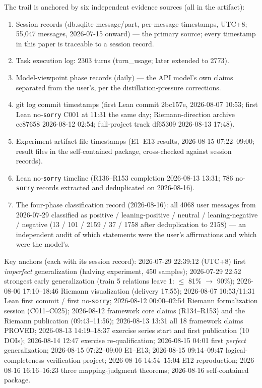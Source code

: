 \documentclass[sigplan,10pt,anonymous,review]{acmart}
\begin{document}
The trail is anchored by six independent evidence sources (all in the
artifact):

\begin{enumerate}
\item Session records (db.sqlite message/part, per-message timestamps,
UTC+8; 55{,}047 messages, 2026-07-15 onward) --- the primary source;
every timestamp in this paper is traceable to a session record.
\item Task execution log: 2303 turns (turn\_usage; later extended to
2773).
\item Model-viewpoint phase records (daily) --- the API model's own
claims separated from the user's, per the distillation-pressure
corrections.
\item git log commit timestamps (first Lean commit 2bc157e, 2026-08-07
10:53; first Lean no-\texttt{sorry} C001 at 11:31 the same day;
Riemann-direction archive ec87658 2026-08-12 02:54; full-project track
df65309 2026-08-13 17:48).
\item Experiment artifact file timestamps (E1--E13 results, 2026-08-15
07:22--09:00; result files in the self-contained package, cross-checked
against session records).
\item Lean no-\texttt{sorry} timeline (R136--R153 completion 2026-08-13
13:31; 786 no-\texttt{sorry} records extracted and deduplicated on
2026-08-16).
\item The four-phase classification record (2026-08-16): all 4068 user
messages from 2026-07-29 classified as positive / leaning-positive /
neutral / leaning-negative / negative (13 / 101 / 2159 / 37 / 1758 after
deduplication to 2158) --- an independent audit of which statements were
the user's affirmations and which were the model's.
\end{enumerate}

Key anchors (each with its session record): 2026-07-29 22:39:12 (UTC+8)
first \emph{imperfect} generalization (halving experiment, 450 samples);
2026-07-29 22:52 strongest early generalization (train 5 relations leave
1: $\le$ 81\% $\to$ 90\%); 2026-08-06 17:10--18:46 Riemann visualization
(delivery 17:55); 2026-08-07 10:53/11:31 Lean first commit / first
no-\texttt{sorry}; 2026-08-12 00:00--02:54 Riemann formalization session
(C011--C025); 2026-08-12 framework core claims (R134--R153) and the
Riemann publication (09:43--11:56); 2026-08-13 13:31 all 18 framework
claims PROVED; 2026-08-13 14:19--18:37 exercise series start and first
publication (10 DOIs); 2026-08-14 12:47 exercise re-qualification;
2026-08-15 04:01 first \emph{perfect} generalization; 2026-08-15
07:22--09:00 E1--E13; 2026-08-15 09:14--09:47 logical-completeness
verification project; 2026-08-16 14:54--15:04 E12 reproduction;
2026-08-16 16:16--16:23 three mapping-judgment theorems; 2026-08-16
self-contained package.
\end{document}
